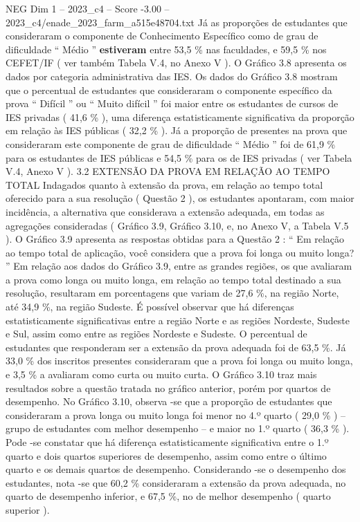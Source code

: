\begin{textsample}{NEG Dim 1 – 2023\_c4 – Score -3.00 – 2023\_c4/enade\_2023\_farm\_a515e48704.txt}
Já as proporções de estudantes que consideraram o componente de Conhecimento Específico como de grau de dificuldade “ Médio ” \textbf{estiveram} entre 53,5 \% nas faculdades, e 59,5 \% nos CEFET/IF ( ver também Tabela V.4, no Anexo V ).
O Gráfico 3.8 apresenta os dados por categoria administrativa das IES.
Os dados do Gráfico 3.8 mostram que o percentual de estudantes que consideraram o componente específico da prova “ Difícil ” ou “ Muito difícil ” foi maior entre os estudantes de cursos de IES privadas ( 41,6 \% ), uma diferença estatisticamente significativa da proporção em relação às IES públicas ( 32,2 \% ).
Já a proporção de presentes na prova que consideraram este componente de grau de dificuldade “ Médio ” foi de 61,9 \% para os estudantes de IES públicas e 54,5 \% para os de IES privadas ( ver Tabela V.4, Anexo V ). 3.2 EXTENSÃO DA PROVA EM RELAÇÃO AO TEMPO TOTAL Indagados quanto à extensão da prova, em relação ao tempo total oferecido para a sua resolução ( Questão 2 ), os estudantes apontaram, com maior incidência, a alternativa que considerava a extensão adequada, em todas as agregações consideradas ( Gráfico 3.9, Gráfico 3.10, e, no Anexo V, a Tabela V.5 ).
O Gráfico 3.9 apresenta as respostas obtidas para a Questão 2 : “ Em relação ao tempo total de aplicação, você considera que a prova foi longa ou muito longa? ” Em relação aos dados do Gráfico 3.9, entre as grandes regiões, os que avaliaram a prova como longa ou muito longa, em relação ao tempo total destinado a sua resolução, resultaram em porcentagens que variam de 27,6 \%, na região Norte, até 34,9 \%, na região Sudeste.
É possível observar que há diferenças estatisticamente significativas entre a região Norte e as regiões Nordeste, Sudeste e Sul, assim como entre as regiões Nordeste e Sudeste.
O percentual de estudantes que responderam ser a extensão da prova adequada foi de 63,5 \%.
Já 33,0 \% dos inscritos presentes consideraram que a prova foi longa ou muito longa, e 3,5 \% a avaliaram como curta ou muito curta.
O Gráfico 3.10 traz mais resultados sobre a questão tratada no gráfico anterior, porém por quartos de desempenho.
No Gráfico 3.10, observa -se que a proporção de estudantes que consideraram a prova longa ou muito longa foi menor no 4.º quarto ( 29,0 \% ) – grupo de estudantes com melhor desempenho – e maior no 1.º quarto ( 36,3 \% ).
Pode -se constatar que há diferença estatisticamente significativa entre o 1.º quarto e dois quartos superiores de desempenho, assim como entre o último quarto e os demais quartos de desempenho.
Considerando -se o desempenho dos estudantes, nota -se que 60,2 \% consideraram a extensão da prova adequada, no quarto de desempenho inferior, e 67,5 \%, no de melhor desempenho ( quarto superior ).

\end{textsample}
